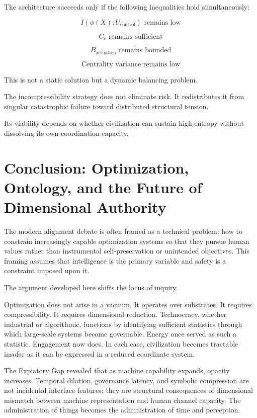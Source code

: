 \documentclass[12pt]{article}
\begin{document}
The architecture succeeds only if the following inequalities hold simultaneously:

\[
I(\phi(X); U_{\text{control}}) \text{ remains low}
\]

\[
C_c \text{ remains sufficient}
\]

\[
B_{\text{actuation}} \text{ remains bounded}
\]

\[
\text{Centrality variance remains low}
\]

This is not a static solution but a dynamic balancing problem.

The incompressibility strategy does not eliminate risk. It redistributes it from singular catastrophic failure toward distributed structural tension.

Its viability depends on whether civilization can sustain high entropy without dissolving its own coordination capacity.

\section{Conclusion: Optimization, Ontology, and the Future of Dimensional Authority}

The modern alignment debate is often framed as a technical problem: how to constrain increasingly capable optimization systems so that they pursue human values rather than instrumental self-preservation or unintended objectives. This framing assumes that intelligence is the primary variable and safety is a constraint imposed upon it.

The argument developed here shifts the locus of inquiry.

Optimization does not arise in a vacuum. It operates over substrates. It requires compressibility. It requires dimensional reduction. Technocracy, whether industrial or algorithmic, functions by identifying sufficient statistics through which large-scale systems become governable. Energy once served as such a statistic. Engagement now does. In each case, civilization becomes tractable insofar as it can be expressed in a reduced coordinate system.

The Expiatory Gap revealed that as machine capability expands, opacity increases. Temporal dilation, governance latency, and symbolic compression are not incidental interface features; they are structural consequences of dimensional mismatch between machine representation and human channel capacity. The administration of things becomes the administration of time and perception.
\end{document}
